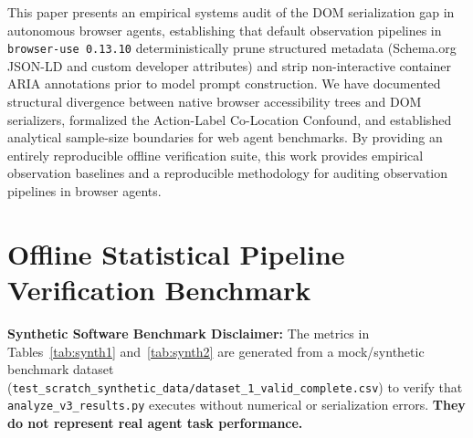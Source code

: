 \documentclass[11pt,a4paper]{article}
\begin{document}
This paper presents an empirical systems audit of the DOM serialization gap in autonomous browser agents, establishing that default observation pipelines in \texttt{browser-use 0.13.10} deterministically prune structured metadata (Schema.org JSON-LD and custom developer attributes) and strip non-interactive container ARIA annotations prior to model prompt construction. We have documented structural divergence between native browser accessibility trees and DOM serializers, formalized the Action-Label Co-Location Confound, and established analytical sample-size boundaries for web agent benchmarks. By providing an entirely reproducible offline verification suite, this work provides empirical observation baselines and a reproducible methodology for auditing observation pipelines in browser agents.




\clearpage
\appendix

\section{Offline Statistical Pipeline Verification Benchmark}
\label{app:benchmark}

\textbf{Synthetic Software Benchmark Disclaimer:} The metrics in Tables~\ref{tab:synth1} and~\ref{tab:synth2} are generated from a mock/synthetic benchmark dataset (\texttt{test\_scratch\_synthetic\_data/dataset\_1\_valid\_complete.csv}) to verify that \texttt{analyze\_v3\_results.py} executes without numerical or serialization errors. \textbf{They do not represent real agent task performance.}
\end{document}

